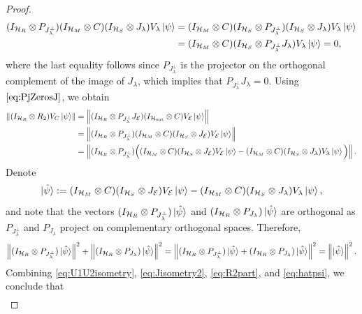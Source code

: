 \documentclass[10pt]{article}
\newcommand{\SOUT}{\mathrm{out}}
\newcommand{\norm}[1]{\left\|#1\right\|}
\begin{document}
\begin{proof}
\begin{align}
            (I_{{\cal H}_R}\otimes P_{J_{\lambda}^{\perp}})(I_{{\cal H}_{M}}\otimes C) (I_{{\cal H}_{S}}\otimes J_{\lambda})V_{\lambda}\ket{\psi}&\nonumber=(I_{{\cal H}_M}\otimes C)(I_{{\cal H}_{S}}\otimes P_{J_{\lambda}^{\perp}}) (I_{{\cal H}_{S}}\otimes J_{\lambda})V_{\lambda}\ket{\psi}\\
            &=(I_{{\cal H}_M}\otimes C) (I_{{\cal H}_{S}}\otimes P_{J_{\lambda}^{\perp}}J_{\lambda})V_{\lambda}\ket{\psi}=0,\label{eq:PjZerosJ}
        \end{align}
        where the last equality follows since $P_{J_{\lambda}^\perp}$ is the projector on the orthogonal complement of the image of $J_{\lambda}$, which implies that $P_{J_{\lambda}^\perp}J_{\lambda}=0$. Using $\eqref{eq:PjZerosJ}$, we obtain
        \begin{align}
            \norm{(I_{\calH_R}\otimes R_2)V_C\ket{\psi}}&\nonumber=\norm{(I_{\calH_R}\otimes P_{J_{\lambda}^\perp}J_{\calE})(I_{\calH_{\SOUT}}\otimes C)V_\calE\ket{\psi}}\\
            &\nonumber=\norm{(I_{\calH_R}\otimes P_{J_{\lambda}^\perp})(I_{\calH_{M}}\otimes C)(I_{\calH_S}\otimes J_{\calE})V_\calE\ket{\psi}}\\
            &=\norm{(I_{\calH_R}\otimes P_{J_{\lambda}^\perp})\Big( (I_{\calH_{M}}\otimes C)(I_{\calH_S}\otimes J_{\calE})V_\calE\ket{\psi}- (I_{\calH_{M}}\otimes C) (I_{\calH_{S}}\otimes J_{\lambda})V_{\lambda}\ket{\psi}\Big)}.\label{eq:R2part} 
        \end{align} Denote 
        \[\ket{\hat{\psi}}:=(I_{{\cal H}_{M}}\otimes C)(I_{{\cal H}_S}\otimes J_{{\cal E}})V_{\cal E}\ket{\psi}- (I_{{\cal H}_{M}}\otimes C) (I_{{\cal H}_{S}}\otimes J_{\lambda})V_{\lambda}\ket{\psi},\]
        and note that the vectors $(I_{{\cal H}_R}\otimes P_{J_{\lambda}^{\perp}})\ket{\hat{\psi}}$ and $(I_{{\cal H}_R}\otimes P_{J_{\lambda}})\ket{\hat{\psi}}$ are orthogonal  as $P_{J_{\lambda}^\perp}$ and $P_{J_{\lambda}}$ project on  complementary orthogonal spaces. Therefore,
        \begin{equation}
             \norm{(I_{\calH_R}\otimes P_{J_{\lambda}^{\perp}})\ket{\hat{\psi}}}^2+\norm{(I_{\calH_R}\otimes P_{J_{\lambda}})\ket{\hat{\psi}}}^2=\norm{(I_{\calH_R}\otimes P_{J_{\lambda}^{\perp}})\ket{\hat{\psi}}+(I_{\calH_R}\otimes P_{J_{\lambda}})\ket{\hat{\psi}}}^2=\norm{\ket{\hat{\psi}}}^2.\label{eq:hatpsi}
        \end{equation}
        Combining \eqref{eq:U1U2isometry}, \eqref{eq:Jisometry2}, \eqref{eq:R2part}, and \eqref{eq:hatpsi}, we conclude that
        \begin{align*}

\end{align*}
\end{proof}
\end{document}
